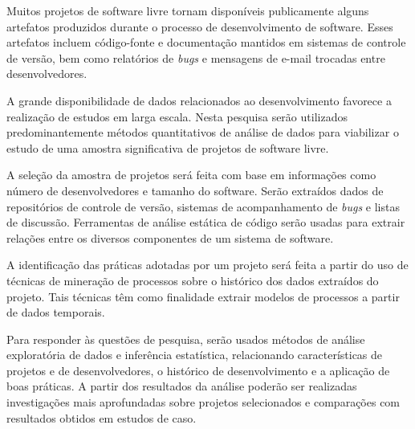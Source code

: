 \documentclass{article}
\begin{document}


Muitos projetos de software livre tornam disponíveis publicamente alguns
artefatos produzidos durante o processo de desenvolvimento de software. Esses
artefatos incluem código-fonte e documentação mantidos em sistemas de controle
de versão, bem como relatórios de \emph{bugs} e mensagens de e-mail trocadas
entre desenvolvedores. 

A grande disponibilidade de dados relacionados ao desenvolvimento favorece a
realização de estudos em larga escala. Nesta pesquisa serão utilizados
predominantemente métodos quantitativos de análise de dados para viabilizar o
estudo de uma amostra significativa de projetos de software livre.

A seleção da amostra de projetos será feita com base em informações como número
de desenvolvedores e tamanho do software. Serão extraídos dados de repositórios
de controle de versão, sistemas de acompanhamento de \emph{bugs} e listas de
discussão.  Ferramentas de análise estática de código serão usadas para extrair
relações entre os diversos componentes de um sistema de software.


A identificação das práticas adotadas por um projeto será feita a partir do uso
de técnicas de mineração de processos \cite{rubin2007} sobre o histórico dos
dados extraídos do projeto. Tais técnicas têm como finalidade extrair modelos de
processos a partir de dados temporais.

Para responder às questões de pesquisa, serão usados métodos de análise
exploratória de dados e inferência estatística, relacionando características de
projetos e de desenvolvedores, o histórico de desenvolvimento e a aplicação de
boas práticas. A partir dos resultados da análise poderão ser realizadas
investigações mais aprofundadas sobre projetos selecionados e comparações com
resultados obtidos em estudos de caso.
\end{document}
